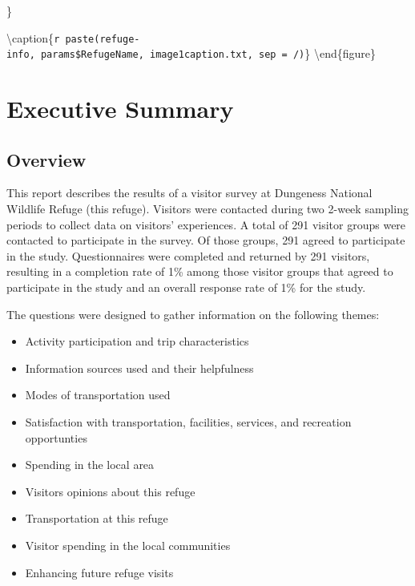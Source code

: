 \documentclass[]{book}
\providecommand{\tightlist}{%
  \setlength{\itemsep}{0pt}\setlength{\parskip}{0pt}}
\begin{document}
\}

\textbackslash{}caption\{\texttt{r\ paste(\textquotesingle{}refuge-info\textquotesingle{},\ params\$RefugeName,\ \textquotesingle{}image1caption.txt\textquotesingle{},\ sep\ =\ \textquotesingle{}/\textquotesingle{})}\}\label{fig:ref-image1}
\textbackslash{}end\{figure\}

\chapter*{Executive Summary}\label{executive-summary}

\section*{Overview}\label{overview}

This report describes the results of a visitor survey at Dungeness
National Wildlife Refuge (this refuge). Visitors were contacted during
two 2-week sampling periods to collect data on visitors' experiences. A
total of 291 visitor groups were contacted to participate in the survey.
Of those groups, 291 agreed to participate in the study. Questionnaires
were completed and returned by 291 visitors, resulting in a completion
rate of 1\% among those visitor groups that agreed to participate in the
study and an overall response rate of 1\% for the study.

The questions were designed to gather information on the following
themes:

\begin{itemize}
\tightlist
\item
  Activity participation and trip characteristics
\item
  Information sources used and their helpfulness
\item
  Modes of transportation used
\item
  Satisfaction with transportation, facilities, services, and recreation
  opportunties
\item
  Spending in the local area
\item
  Visitors opinions about this refuge
\item
  Transportation at this refuge
\item
  Visitor spending in the local communities
\item
  Enhancing future refuge visits
\end{itemize}
\end{document}
